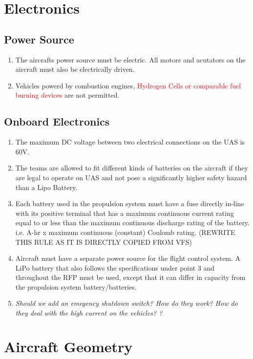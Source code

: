 \documentclass{article}
\begin{document}
\section{Electronics}

\subsection{Power Source}
\begin{enumerate}
  \item The aircrafts power source must be electric. All motors and acutators on the aircraft must also be electrically driven.
  \item Vehicles powerd by combustion engines, \textcolor{red}{Hydrogen Cells or comparable fuel burning devices} are not permitted. 
\end{enumerate}

\subsection{Onboard Electronics}
\begin{enumerate}
  \item The maximum DC voltage between two electrical connections on the UAS is 60V.
  \item The teams are allowed to fit different kinds of batteries on the aircraft if they are legal to operate on UAS and not pose a significantly higher safety hazard than a Lipo Battery. 
  \item Each battery used in the propulsion system must have a fuse directly in-line with its positive
  terminal that has a maximum continuous current rating equal to or less than the maximum continuous discharge rating of the battery. i.e. A-hr x maximum continuous (constant) Coulomb rating. (REWRITE THIS RULE AS IT IS DIRECTLY COPIED FROM VFS)
  \item Aircraft must have a separate power source for the flight control system. A LiPo battery that also follows the specifications under point 3 and throughout the RFP must be used, except that it can differ in capacity from the propulsion system battery/batteries.
  \item \emph{Should we add an emegency shutdown switch? How do they work? How do they deal with the high current on the vehicles? ?}
\end{enumerate}



\section{Aircraft Geometry}
\end{document}
